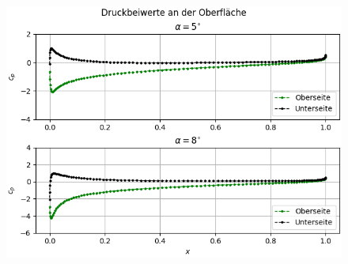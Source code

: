 \begin{figure}[H]
\begin{center} \includegraphics[scale=0.77]{figures/nacacplines.png} \end{center}
\end{figure}

\newpage
